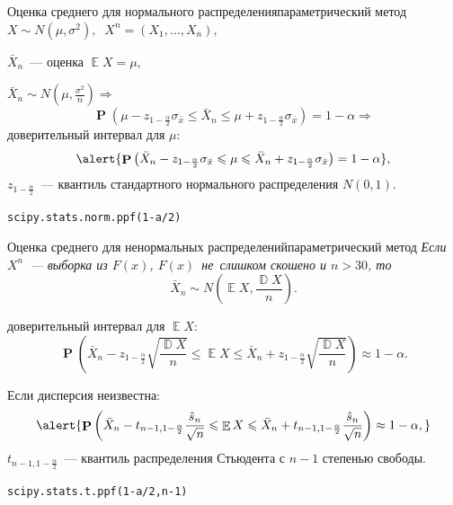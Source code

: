 \documentclass[11pt,pdf,utf8,hyperref={unicode},aspectratio=169]{beamer}
\DeclareMathOperator{\DD}{\mathbb{D}}
\DeclareMathOperator{\EE}{\mathbb{E}}
\DeclareMathOperator{\prob}{\mathbf{P}}
\begin{document}
\begin{frame}{Оценка среднего для нормального распределения}{параметрический метод}
	$X\sim N\left(\mu,\sigma^2\right),\;\; X^n=\left(X_1,\dots,X_n\right),$

	\bigskip

	$\bar{X}_n$~--- оценка $\EE{X}=\mu,$
	\bigskip

    $\bar{X}_n\sim N\left(\mu, \frac{\sigma^2}{n}\right) \Rightarrow $
	$$
        \prob \left(
            \mu-z_{1-\frac{\alpha}{2}}\sigma_{\bar{x}}
            \leqslant \bar{X}_n \leqslant
            \mu +z_{1-\frac{\alpha}{2}}\sigma_{\bar{x}}
        \right)
        = 1-\alpha \Longrightarrow
    $$
	доверительный интервал для $\mu$:
	$$
    \alert{\prob \left(
        \bar{X}_n-z_{1-\frac{\alpha}{2}}\sigma_{\bar{x}}
        \leqslant \mu \leqslant
        \bar{X}_n +z_{1-\frac{\alpha}{2}} \sigma_{\bar{x}}
    \right)
    =
    1-\alpha},
    $$
	$z_{1-\frac{\alpha}{2}}$~--- квантиль стандартного нормального распределения $N(0,1)$.

     \texttt{scipy.stats.norm.ppf(1-a/2)}
\end{frame}

\begin{frame}{Оценка среднего для ненормальных распределений}{параметрический метод}
	 \textit{Если $X^n$~--- выборка из $F(x)$, $F(x)$~не~слишком скошено и $n>30$, то
	$$\bar{X}_n \sim N\left(\EE{X}, \frac{\DD{X}}{n}\right).$$}

	доверительный интервал для $\EE{X}$:
	$$\prob \left(\bar{X}_n-z_{1-\frac{\alpha}{2}} \sqrt{\frac{\DD{X}}{n}}
    \leqslant \EE{X} \leqslant \bar{X}_n +z_{1-\frac{\alpha}{2}} \sqrt{\frac{\DD{X}}{n}} \right)\approx 1-\alpha.$$

	Если дисперсия неизвестна:
	$$\alert{\prob \left(
        \bar{X}_n-t_{n-1, 1-\frac{\alpha}{2}} \frac{\hat{s}_n}{\sqrt{n}}
        \leqslant \EE{X} \leqslant
        \bar{X}_n +t_{n-1, 1-\frac{\alpha}{2}} \frac{\hat{s}_n}{\sqrt{n}} \right
        )\approx 1-\alpha,}
    $$
	$t_{n-1, 1-\frac{\alpha}{2}}$~--- квантиль распределения Стьюдента с $n-1$ степенью свободы.

     \texttt{scipy.stats.t.ppf(1-a/2,n-1)}
\end{frame}
\end{document}
